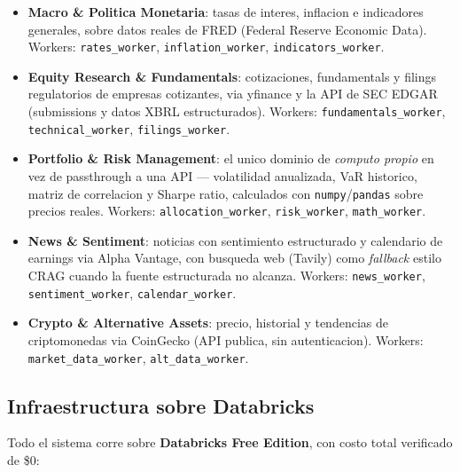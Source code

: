 \documentclass[11pt]{article}
\begin{document}
\begin{itemize}[leftmargin=*]
  \item \textbf{Macro \& Politica Monetaria}: tasas de interes, inflacion e
  indicadores generales, sobre datos reales de FRED (Federal Reserve Economic
  Data). Workers: \texttt{rates\_worker}, \texttt{inflation\_worker},
  \texttt{indicators\_worker}.
  \item \textbf{Equity Research \& Fundamentals}: cotizaciones, fundamentals
  y filings regulatorios de empresas cotizantes, via yfinance y la API de SEC
  EDGAR (submissions y datos XBRL estructurados). Workers:
  \texttt{fundamentals\_worker}, \texttt{technical\_worker},
  \texttt{filings\_worker}.
  \item \textbf{Portfolio \& Risk Management}: el unico dominio de
  \emph{computo propio} en vez de passthrough a una API --- volatilidad
  anualizada, VaR historico, matriz de correlacion y Sharpe ratio, calculados
  con \texttt{numpy}/\texttt{pandas} sobre precios reales. Workers:
  \texttt{allocation\_worker}, \texttt{risk\_worker}, \texttt{math\_worker}.
  \item \textbf{News \& Sentiment}: noticias con sentimiento estructurado y
  calendario de earnings via Alpha Vantage, con busqueda web (Tavily) como
  \emph{fallback} estilo CRAG cuando la fuente estructurada no alcanza.
  Workers: \texttt{news\_worker}, \texttt{sentiment\_worker},
  \texttt{calendar\_worker}.
  \item \textbf{Crypto \& Alternative Assets}: precio, historial y tendencias
  de criptomonedas via CoinGecko (API publica, sin autenticacion). Workers:
  \texttt{market\_data\_worker}, \texttt{alt\_data\_worker}.
\end{itemize}

\subsection{Infraestructura sobre Databricks}

Todo el sistema corre sobre \textbf{Databricks Free Edition}, con costo total
verificado de \$0:
\end{document}
